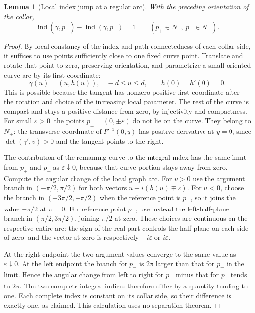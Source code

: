 \documentclass[11pt,oneside]{book}
\newtheorem{lemma}[theorem]{Lemma}
\theoremstyle{definition}
\theoremstyle{remark}\newtheorem{remark}[theorem]{Remark}
\begin{document}
\begin{lemma}[Local index jump at a regular arc]\label{d13:21:jump}
With the preceding orientation of the collar,
\[
 \operatorname{ind}(\gamma,p_+)
       -\operatorname{ind}(\gamma,p_-)=1
 \qquad(p_+\in N_+,\ p_-\in N_-).
\]
\end{lemma}
\begin{proof}
By local constancy of the index and path connectedness of each collar
side, it suffices to use points sufficiently close to one fixed curve
point. Translate and rotate that point to zero, preserving orientation,
and parametrize a small oriented curve arc by its first coordinate:
\[
 \gamma(u)=(u,h(u)),\quad -d\leq u\leq d,
 \qquad h(0)=h'(0)=0.
\]
This is possible because the tangent has nonzero positive first
coordinate after the rotation and choice of the increasing local
parameter. The rest of the curve is compact and stays a positive
distance from zero, by injectivity and compactness. For small
$\varepsilon>0$, the points $p_\pm=(0,\pm\varepsilon)$ do not lie on
the curve. They belong to $N_\pm$: the transverse coordinate of
$F^{-1}(0,y)$ has positive derivative at $y=0$, since
$\det(\gamma',v)>0$ and the tangent points to the right.

The contribution of the remaining curve to the integral index has the
same limit from $p_+$ and $p_-$ as $\varepsilon\downarrow0$, because
that curve portion stays away from zero. Compute the angular change
of the local graph arc. For $u>0$ use the argument branch in
$(-\pi/2,\pi/2)$ for both vectors
$u+i(h(u)\mp\varepsilon)$. For $u<0$, choose the branch in
$(-3\pi/2,-\pi/2)$ when the reference point is $p_+$, so it joins
the value $-\pi/2$ at $u=0$. For reference point $p_-$, use instead
the left-half-plane branch in $(\pi/2,3\pi/2)$, joining $\pi/2$
at zero. These choices are continuous on the respective entire arc:
the sign of the real part controls the half-plane on each side of
zero, and the vector at zero is respectively $-i\varepsilon$ or
$i\varepsilon$.

At the right endpoint the two argument values converge to the same
value as $\varepsilon\downarrow0$. At the left endpoint the branch
for $p_-$ is $2\pi$ larger than that for $p_+$ in the limit. Hence
the angular change from left to right for $p_+$ minus that for $p_-$
tends to $2\pi$. The two complete integral indices therefore differ
by a quantity tending to one. Each complete index is constant on its
collar side, so their difference is exactly one, as claimed. This
calculation uses no separation theorem.
\end{proof}
\end{document}
